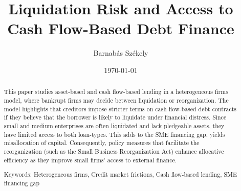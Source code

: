 \documentclass[12pt]{article}
\title{Liquidation Risk and Access to Cash Flow-Based Debt Finance}
\date{}
\begin{document}
\author{Barnabás Székely}
\date{\today}
\vspace{-1in}

\maketitle

\begin{abstract}
\noindent

This paper studies asset-based and cash flow-based lending in a heterogeneous firms model, where bankrupt firms may decide between liquidation or reorganization. The model highlights that creditors impose stricter terms on cash flow-based debt contracts if they believe that the borrower is likely to liquidate under financial distress. Since small and medium enterprises are often liquidated and lack pledgeable assets, they have limited access to both loan-types. This adds to the SME financing gap, yields misallocation of capital. Consequently, policy measures that facilitate the reorganization (such as the Small Business Reorganization Act) enhance allocative efficiency as they improve small firms' access to external finance. 

\bigskip{}
\bigskip{}

Keywords: Heterogeneous firms, Credit market frictions, Cash flow-based lending, SME financing gap
\medskip{}
\end{abstract}
\thispagestyle{empty}

\pagebreak{}
\end{document}
